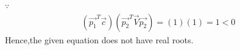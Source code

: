 \documentclass[journal,12pt,twocolumn]{IEEEtran}
\begin{document}
\begin{enumerate}
    $\because$
    \begin{align}
    (\vec{p_1}^T\vec{c})(\vec{p_2}^T\vec{V}\vec{p_2}) = (1)(1) = 1<0
    \end{align}
    Hence,the given equation does not have real roots.
    \end{enumerate}
   
\end{document}
